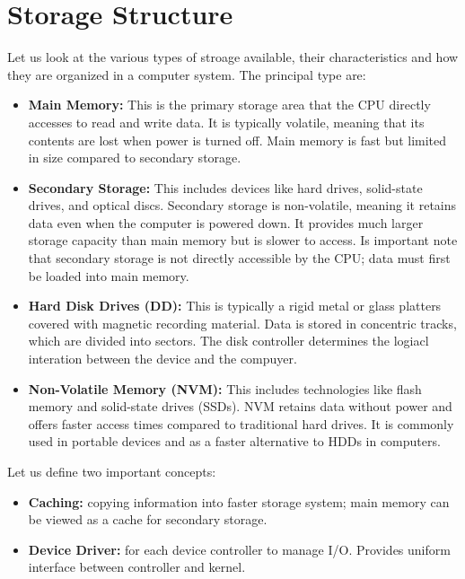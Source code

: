 \section{Storage Structure}

    Let us look at the various types of stroage available, their characteristics and how they are organized in a computer system.
    The principal type are:
        \begin{itemize}
            \item \textbf{Main Memory:} This is the primary storage area that the CPU directly accesses to read and write data. It is typically volatile, meaning that its contents are lost when power is turned off. Main memory is fast but limited in size compared to secondary storage.
            \item \textbf{Secondary Storage:} This includes devices like hard drives, solid-state drives, and optical discs. Secondary storage is non-volatile, meaning it retains data even when the computer is powered down. It provides much larger storage capacity than main memory but is slower to access. Is important note that secondary storage is not directly accessible by the CPU; data must first be loaded into main memory.
            \item \textbf{Hard Disk Drives (DD):} This is typically a rigid metal or glass platters covered with magnetic recording material. Data is stored in concentric tracks, which are divided into sectors. The disk controller determines the logiacl interation between the device and the compuyer.
            \item \textbf{Non-Volatile Memory (NVM):} This includes technologies like flash memory and solid-state drives (SSDs). NVM retains data without power and offers faster access times compared to traditional hard drives. It is commonly used in portable devices and as a faster alternative to HDDs in computers. 
        \end{itemize}
    
    Let us define two important concepts:
        \begin{itemize}
            \item \textbf{Caching:} copying information into faster storage system; main memory can be viewed as a cache for secondary storage.
            \item  \textbf{Device Driver:} for each device controller to manage I/O. Provides uniform interface between controller and kernel.
        \end{itemize}




